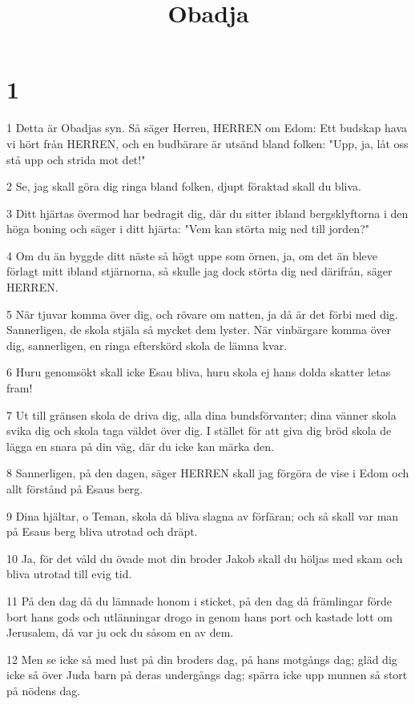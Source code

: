 

\title{Obadja}


\chapter{1}

\par 1 Detta är Obadjas syn. Så säger Herren, HERREN om Edom: Ett budskap hava vi hört från HERREN, och en budbärare är utsänd bland folken: "Upp, ja, låt oss stå upp och strida mot det!"
\par 2 Se, jag skall göra dig ringa bland folken, djupt föraktad skall du bliva.
\par 3 Ditt hjärtas övermod har bedragit dig, där du sitter ibland bergsklyftorna i den höga boning och säger i ditt hjärta: "Vem kan störta mig ned till jorden?"
\par 4 Om du än byggde ditt näste så högt uppe som örnen, ja, om det än bleve förlagt mitt ibland stjärnorna, så skulle jag dock störta dig ned därifrån, säger HERREN.
\par 5 När tjuvar komma över dig, och rövare om natten, ja då är det förbi med dig. Sannerligen, de skola stjäla så mycket dem lyster. När vinbärgare komma över dig, sannerligen, en ringa efterskörd skola de lämna kvar.
\par 6 Huru genomsökt skall icke Esau bliva, huru skola ej hans dolda skatter letas fram!
\par 7 Ut till gränsen skola de driva dig, alla dina bundsförvanter; dina vänner skola svika dig och skola taga väldet över dig. I stället för att giva dig bröd skola de lägga en snara på din väg, där du icke kan märka den.
\par 8 Sannerligen, på den dagen, säger HERREN skall jag förgöra de vise i Edom och allt förstånd på Esaus berg.
\par 9 Dina hjältar, o Teman, skola då bliva slagna av förfäran; och så skall var man på Esaus berg bliva utrotad och dräpt.
\par 10 Ja, för det våld du övade mot din broder Jakob skall du höljas med skam och bliva utrotad till evig tid.
\par 11 På den dag då du lämnade honom i sticket, på den dag då främlingar förde bort hans gods och utlänningar drogo in genom hans port och kastade lott om Jerusalem, då var ju ock du såsom en av dem.
\par 12 Men se icke så med lust på din broders dag, på hans motgångs dag; gläd dig icke så över Juda barn på deras undergångs dag; spärra icke upp munnen så stort på nödens dag.
